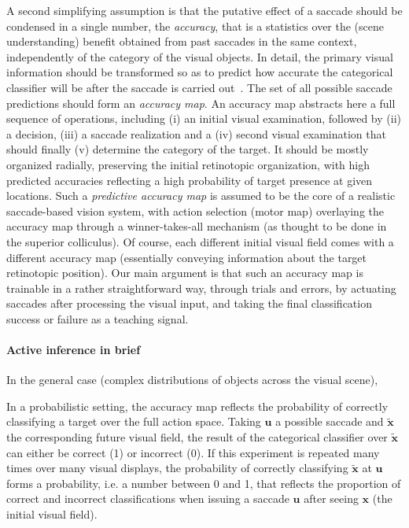 A second simplifying assumption is that the putative effect of a saccade should be condensed in a single number, the \emph{accuracy}, that is a statistics over the (scene understanding) benefit obtained from past saccades in the same context, independently of the category of the visual objects. In detail, the primary visual information should be transformed so as to predict how accurate the categorical classifier will be after the saccade is carried out~\citep{Dauce18}. The set of all possible saccade predictions should form an \emph{accuracy map}.
An accuracy map abstracts here a full sequence of operations, including (i) an initial visual examination, followed by (ii) a decision, (iii) a saccade realization and a (iv) second visual examination that should finally (v) determine the category of the target.
It should be mostly organized radially, preserving the initial retinotopic organization, with high predicted accuracies reflecting a high probability of target presence at given locations.
Such  a \emph{predictive accuracy map} is assumed to be the core of a realistic saccade-based vision system, with action selection (motor map) overlaying the accuracy map through a winner-takes-all mechanism (as thought to be done in the superior colliculus). Of course, each different initial visual field comes with a different accuracy map (essentially conveying information about the target retinotopic position).
Our main argument is that such an accuracy map is trainable in a rather straightforward way, through trials and errors, by actuating saccades after processing the visual input, and taking the final classification success or failure as a teaching signal.


\paragraph{Active inference in brief}








In the general case (complex distributions of objects across the visual scene), 

 In a probabilistic setting, the accuracy map reflects the probability of correctly classifying a target over the full action space. Taking $\boldsymbol{u}$ a possible saccade and $\tilde{\boldsymbol{x}}$ the corresponding future visual field, the result of the categorical classifier over $\tilde{\boldsymbol{x}}$ can either be correct (1) or incorrect (0). If this experiment is repeated many times over many visual displays, the probability of correctly classifying $\tilde{\boldsymbol{x}}$ at $\boldsymbol{u}$ forms a probability, i.e. a number between 0 and 1, that reflects the proportion of correct and incorrect classifications when issuing a saccade $\boldsymbol{u}$ after seeing $\boldsymbol{x}$ (the initial visual field).





